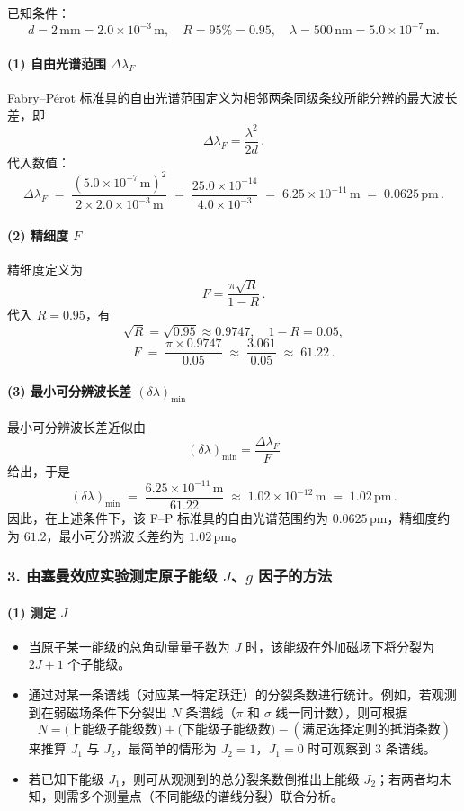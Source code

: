 \documentclass[12pt,a4paper,UTF8]{ctexart}
\begin{document}
已知条件：
\[
d = 2\,\text{mm} = 2.0 \times 10^{-3}\,\text{m}, 
\quad R = 95\% = 0.95, 
\quad \lambda = 500\,\text{nm} = 5.0 \times 10^{-7}\,\text{m}.
\]

\paragraph{(1) 自由光谱范围 $\Delta \lambda_F$}  
Fabry–Pérot 标准具的自由光谱范围定义为相邻两条同级条纹所能分辨的最大波长差，即
\[
\Delta \lambda_F = \frac{\lambda^2}{2d}\,.
\]
代入数值：
\[
\Delta \lambda_F \;=\; \frac{(5.0 \times 10^{-7}\,\mathrm{m})^2}{2 \times 2.0 \times 10^{-3}\,\mathrm{m}}
\;=\; \frac{25.0 \times 10^{-14}}{4.0 \times 10^{-3}}
\;=\; 6.25 \times 10^{-11}\,\mathrm{m}
\;=\; 0.0625\,\mathrm{pm}\,.
\]

\paragraph{(2) 精细度 $F$}  
精细度定义为
\[
F = \frac{\pi \sqrt{R}}{1 - R} \,.
\]
代入 $R = 0.95$，有
\[
\sqrt{R} = \sqrt{0.95} \approx 0.9747, 
\quad
1 - R = 0.05,
\]
\[
F \;=\; \frac{\pi \times 0.9747}{0.05} 
\;\approx\; \frac{3.061}{0.05} 
\;\approx\; 61.22\,.
\]

\paragraph{(3) 最小可分辨波长差 $(\delta \lambda)_{\min}$}  
最小可分辨波长差近似由
\[
(\delta \lambda)_{\min} = \frac{\Delta \lambda_F}{F}
\]
给出，于是
\[
(\delta \lambda)_{\min} \;=\; \frac{6.25 \times 10^{-11}\,\mathrm{m}}{61.22} 
\;\approx\; 1.02 \times 10^{-12}\,\mathrm{m} 
\;=\; 1.02\,\mathrm{pm}\,.
\]
因此，在上述条件下，该 F–P 标准具的自由光谱范围约为 $0.0625\,\mathrm{pm}$，精细度约为 $61.2$，最小可分辨波长差约为 $1.02\,\mathrm{pm}$。

\subsubsection*{3. 由塞曼效应实验测定原子能级 $J$、$g$ 因子的方法}

\paragraph{(1) 测定 $J$}  
\begin{itemize}
  \item 当原子某一能级的总角动量量子数为 $J$ 时，该能级在外加磁场下将分裂为 $2J+1$ 个子能级。  
  \item 通过对某一条谱线（对应某一特定跃迁）的分裂条数进行统计。例如，若观测到在弱磁场条件下分裂出 $N$ 条谱线（$\pi$ 和 $\sigma$ 线一同计数），则可根据
  \[
    N = \text{(上能级子能级数)} + \text{(下能级子能级数)} - (\text{满足选择定则的抵消条数})
  \]
  来推算 $J_1$ 与 $J_2$，最简单的情形为 $J_2 = 1$，$J_1 = 0$ 时可观察到 3 条谱线。  
  \item 若已知下能级 $J_1$，则可从观测到的总分裂条数倒推出上能级 $J_2$；若两者均未知，则需多个测量点（不同能级的谱线分裂）联合分析。  
\end{itemize}
\end{document}
